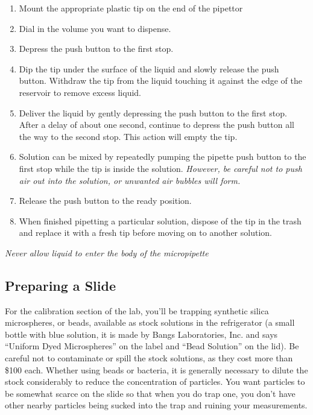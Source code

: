 \documentclass{../lab}
\begin{document}
\begin{enumerate}
    \item Mount the appropriate plastic tip on the end of the pipettor

    \item Dial in the volume you want to dispense.

    \item Depress the push button to the first stop.

    \item Dip the tip under the surface of the liquid and slowly release the push button. Withdraw the tip from the liquid touching it against the edge of the reservoir to remove excess liquid.

    \item Deliver the liquid by gently depressing the push button to the first stop. After a delay of about one second, continue to depress the push button all the way to the second stop. This action will empty the tip.

    \item Solution can be mixed by repeatedly pumping the pipette push button to the first stop while the tip is inside the solution. \emph{However, be careful not to push air out into the solution, or unwanted air bubbles will form.}

    \item Release the push button to the ready position.

    \item When finished pipetting a particular solution, dispose of the tip in the trash and replace it with a fresh tip before moving on to another solution.
\end{enumerate}

\emph{Never allow liquid to enter the body of the micropipette}

\subsection{Preparing a Slide}

For the calibration section of the lab, you'll be trapping synthetic silica microspheres, or beads, available as stock solutions in the refrigerator (a small bottle with blue solution, it is made by Bangs Laboratories, Inc. and says ``Uniform Dyed Microspheres'' on the label and ``Bead Solution'' on the lid). Be careful not to contaminate or spill the stock solutions, as they cost more than \$100 each. Whether using beads or bacteria, it is generally necessary to dilute the stock considerably to reduce the concentration of particles. You want particles to be somewhat scarce on the slide so that when you do trap one, you don't have other nearby particles being sucked into the trap and ruining your measurements.
\end{document}

